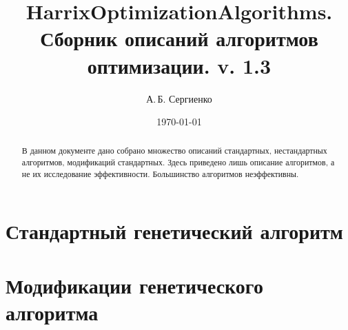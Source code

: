 \documentclass[a4paper,12pt]{article}
\title{HarrixOptimizationAlgorithms. Сборник описаний алгоритмов оптимизации. v. 1.3}
\author{А.\,Б. Сергиенко}
\date{\today}
\begin{document}


\maketitle

\begin{abstract}
В данном документе дано собрано множество описаний стандартных, нестандартных алгоритмов, модификаций стандартных. Здесь приведено лишь описание алгоритмов, а не их исследование эффективности. Большинство алгоритмов неэффективны.
\end{abstract}

\tableofcontents

\newpage







\section{Стандартный генетический алгоритм}\label{HarrixOptimizationAlgorithms:GA}




\section{Модификации генетического алгоритма}\label{HarrixOptimizationAlgorithms:ModGA}










\newpage
\end{document}
